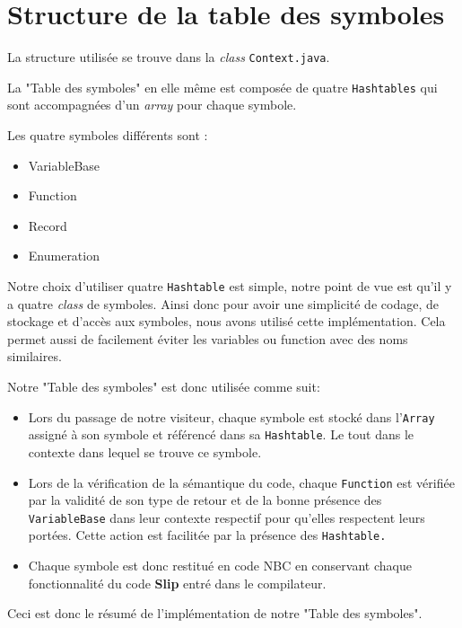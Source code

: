 \section{Structure de la table des symboles}

La structure utilisée se trouve dans la \emph{class} \texttt{Context.java}.

La "Table des symboles" en elle même est composée de quatre \texttt{Hashtables} qui sont accompagnées d'un \emph{array} pour chaque symbole.

Les quatre symboles différents sont :
\begin{itemize}
    \item VariableBase
    \item Function
    \item Record
    \item Enumeration
\end{itemize}

Notre choix d'utiliser quatre \texttt{Hashtable} est simple, notre point de vue est qu'il y a quatre \emph{class} de symboles. Ainsi donc pour avoir une simplicité de codage, de stockage et d'accès aux symboles, nous avons utilisé cette implémentation.
Cela permet aussi de facilement éviter les variables ou function avec des noms similaires.

Notre "Table des symboles" est donc utilisée comme suit:
\begin{itemize}
    \item Lors du passage de notre visiteur, chaque symbole est stocké dans l'\texttt{Array} assigné à son symbole et référencé dans sa \texttt{Hashtable}. Le tout dans le contexte dans lequel se trouve ce symbole.
    \item Lors de la vérification de la sémantique du code, chaque \texttt{Function} est vérifiée par la validité de son type de retour et de la bonne présence des \texttt{VariableBase} dans leur contexte respectif pour qu'elles respectent leurs portées. Cette action est facilitée par la présence des \texttt{Hashtable.}
    \item Chaque symbole est donc restitué en code NBC en conservant chaque fonctionnalité du code \textbf{Slip} entré dans le compilateur.
\end{itemize}

Ceci est donc le résumé de l'implémentation de notre "Table des symboles".